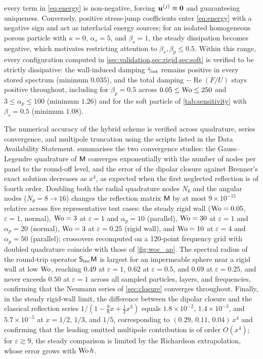 every term in \cref{eq:energy} is non-negative, forcing $\bm{u}^{(j)}\equiv\bm 0$ and guaranteeing uniqueness. Conversely,
positive stress-jump coefficients enter \cref{eq:energy} with a negative sign and act as interfacial energy sources; for an
isolated homogeneous porous particle with $\kappa=0$, $\alpha_s=5$, and $\beta_s=1$, the steady dissipation becomes
negative, which motivates restricting attention to $\beta_s,\beta_p\le0.5$. Within this range, every configuration
computed in \cref{sec:validation,sec:rigid,sec:soft} is verified to be strictly dissipative: the wall-induced damping
$\hat\gamma_{\rm int}$ remains positive in every stored spectrum (minimum $0.035$), and the total damping
$-\operatorname{Re}(F/U)$ stays positive throughout, including for $\beta_p=0.5$ across $0.05\le\mathrm{Wo}\le250$ and
$3\le\alpha_p\le100$ (minimum $1.26$) and for the soft particle of \cref{tab:sensitivity} with $\beta_s=0.5$ (minimum
$1.08$).

The numerical accuracy of the hybrid scheme is verified across quadrature, series convergence, and multipole truncation
using the scripts listed in the Data Availability Statement.  summarises the two convergence studies: the Gauss--Legendre
quadrature of $\mathsf{M}$ converges exponentially with the number of nodes per panel to the round-off level, and the error of
the dipolar closure against Brenner's exact solution decreases as $x^4$, as expected when the first neglected
reflection is of fourth order. Doubling both the radial quadrature nodes $N_k$ and the
angular nodes ($N_\theta=8\to16$) changes the reflection matrix $\mathsf{M}$ by at most $9\times10^{-15}$ relative across five
representative test cases: the steady rigid wall ($\mathrm{Wo}=0.05$, $\varepsilon=1$, normal), $\mathrm{Wo}=3$ at $\varepsilon=1$ and
$\alpha_p=10$ (parallel), $\mathrm{Wo}=30$ at $\varepsilon=1$ and $\alpha_p=20$ (normal), $\mathrm{Wo}=3$ at $\varepsilon=0.25$ (rigid
wall), and $\mathrm{Wo}=10$ at $\varepsilon=4$ and $\alpha_p=50$ (parallel); crossovers recomputed on a 120-point frequency grid
with doubled quadrature coincide with those of \cref{fig:woc_ap}. The spectral radius of the round-trip operator
$\mathsf S_{\rm inc}\mathsf{M}$ is largest for an impermeable sphere near a rigid wall at low $\mathrm{Wo}$, reaching $0.49$ at
$\varepsilon=1$, $0.62$ at $\varepsilon=0.5$, and $0.69$ at $\varepsilon=0.25$, and never exceeds $0.50$ at $\varepsilon=1$
across all sampled particles, layers, and frequencies, confirming that the Neumann series of \cref{sec:closure} converges
throughout. Finally, in the steady rigid-wall limit, the difference between the dipolar closure and the classical
reflection series $1/(1-\tfrac98x+\tfrac12x^3)$ equals $1.8\times10^{-2}$, $1.4\times10^{-3}$, and $5.7\times10^{-5}$ at
$x=1/2$, $1/3$, and $1/5$, corresponding to $(0.29,\,0.11,\,0.04)\,x^4$ and confirming that the leading omitted multipole
contribution is of order $O(x^4)$; for $\varepsilon\gtrsim9$, the steady comparison is limited by the Richardson
extrapolation, whose error grows with $\mathrm{Wo}\,h$.

